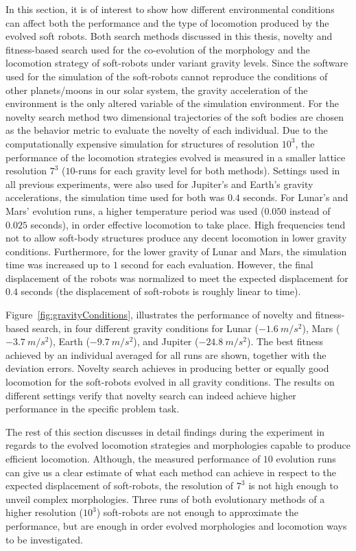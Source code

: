 In this section, it is of interest to show how different environmental conditions can affect both the performance and the type of locomotion produced by the evolved soft robots. Both search methods discussed in this thesis, novelty and fitness-based search used for the co-evolution of the morphology and the locomotion strategy of soft-robots under variant gravity levels. Since the software used for the simulation of the soft-robots cannot reproduce the conditions of other planets/moons in our solar system, the gravity acceleration of the environment is the only altered variable of the simulation environment. For the novelty search method two dimensional trajectories of the soft bodies are chosen as the behavior metric to evaluate the novelty of each individual. Due to the computationally expensive simulation for structures of resolution $10^3$, the performance of the locomotion strategies evolved is measured in a smaller lattice resolution $7^3$ ($10$-runs for each gravity level for both methods). Settings used in all previous experiments, were also used for Jupiter's and Earth's gravity accelerations, the simulation time used for both was $0.4$ seconds. For Lunar's and Mars' evolution runs, a higher temperature period was used ($0.050$ instead of $0.025$ seconds), in order effective locomotion to take place. High frequencies tend not to allow soft-body structures produce any decent locomotion in lower gravity conditions. Furthermore, for the lower gravity of Lunar and Mars, the simulation time was increased up to $1$ second for each evaluation. However, the final displacement of the robots was normalized to meet the expected displacement for $0.4$ seconds (the displacement of soft-robots is roughly linear to time).

Figure~\ref{fig:gravityConditions}, illustrates the performance of novelty and fitness-based search, in four different gravity conditions for Lunar ($-1.6~m/s^2$), Mars ($-3.7~m/s^2$), Earth ($-9.7~m/s^2$), and Jupiter ($-24.8~m/s^2$). The best fitness achieved by an individual averaged for all runs are shown, together with the deviation errors. Novelty search achieves in producing better or equally good locomotion for the soft-robots evolved in all gravity conditions. The results on different settings verify that novelty search can indeed achieve higher performance in the specific problem task. 

The rest of this section discusses in detail findings during the experiment in regards to the evolved locomotion strategies and morphologies capable to produce efficient locomotion. Although, the measured performance of $10$ evolution runs can give us a clear estimate of what each method can achieve in respect to the expected displacement of soft-robots, the resolution of $7^3$ is not high enough to unveil complex morphologies. Three runs of both evolutionary methods of a higher resolution ($10^3$) soft-robots are not enough to approximate the performance, but are enough in order evolved morphologies and locomotion ways to be investigated.



